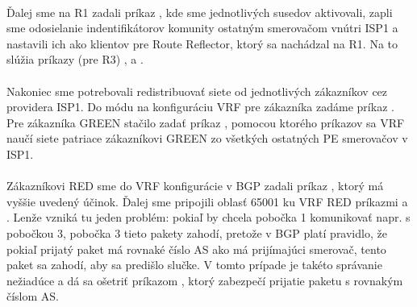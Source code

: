 \documentclass[12pt,twoside,a4paper]{report}
\begin{document}
\paragraph{}
Ďalej sme na R1 zadali príkaz , kde sme jednotlivých susedov aktivovali, zapli sme odosielanie indentifikátorov komunity ostatným smerovačom vnútri ISP1 a nastavili ich ako klientov pre Route Reflector, ktorý sa nachádzal na R1. Na to slúžia príkazy (pre R3) ,  a .

\paragraph{}
Nakoniec sme potrebovali redistribuovať siete od jednotlivých zákazníkov cez providera ISP1. Do módu na konfiguráciu VRF pre zákazníka zadáme príkaz . Pre zákazníka GREEN stačilo zadať príkaz , pomocou ktorého príkazov sa VRF naučí siete patriace zákazníkovi GREEN zo všetkých ostatných PE smerovačov v ISP1. 

\paragraph{}
Zákazníkovi RED sme do VRF konfigurácie v BGP zadali príkaz , ktorý má vyššie uvedený účinok. Ďalej sme pripojili oblasť 65001 ku VRF RED príkazmi  a . Lenže vzniká tu jeden problém: pokiaľ by chcela pobočka 1 komunikovať napr. s pobočkou 3, pobočka 3 tieto pakety zahodí, pretože v BGP platí pravidlo, že pokiaľ prijatý paket má rovnaké číslo AS ako má prijímajúci smerovač, tento paket sa zahodí, aby sa predišlo slučke. V tomto prípade je takéto správanie nežiadúce a dá sa ošetriť príkazom , ktorý zabezpečí prijatie paketu s rovnakým číslom AS.
\end{document}
